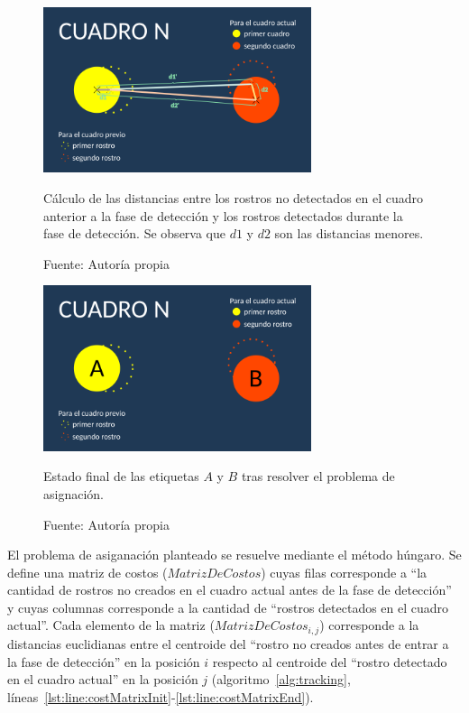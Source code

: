 \documentclass[a4paper,openright,12pt]{report}
\begin{document}
\begin{figure}[!h]
  \centering
    \includegraphics[width=0.7\textwidth]{../images/hungarian-example-3.png}\par
  \caption{Cálculo de las distancias entre los rostros no detectados en el
           cuadro anterior a la fase de detección y los rostros detectados
           durante la fase de detección. Se observa que $d1$ y $d2$ son las
           distancias menores.}
    \label{fig:hungarian-example-3}
  \caption*{Fuente: Autoría propia}
\end{figure}

\begin{figure}[!h]
  \centering
    \includegraphics[width=0.7\textwidth]{../images/hungarian-example-4.png}\par
  \caption{Estado final de las etiquetas $A$ y $B$ tras resolver el problema de
           asignación.}
    \label{fig:hungarian-example-4}
  \caption*{Fuente: Autoría propia}
\end{figure}

El problema de asiganación planteado se resuelve mediante el método húngaro. Se
define una matriz de costos ($MatrizDeCostos$) cuyas filas corresponde a ``la
cantidad de rostros no creados en el cuadro actual antes de la fase de
detección'' y cuyas columnas corresponde a la cantidad de ``rostros detectados
en el cuadro actual''. Cada elemento de la matriz ($MatrizDeCostos_{i,j}$)
corresponde a la distancias euclidianas entre el centroide del
``rostro no creados antes de entrar a la fase de detección'' en la posición
$i$ respecto al centroide del ``rostro detectado en el cuadro actual'' en
la posición $j$ (algoritmo~\ref{alg:tracking},
líneas~\ref{lst:line:costMatrixInit}-\ref{lst:line:costMatrixEnd}).\\
\end{document}
